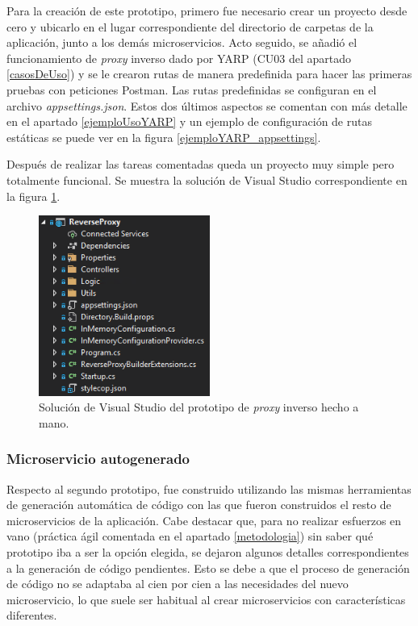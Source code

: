 \documentclass[11pt,spanish,listoffigures]{tfgetsinf}
\begin{document}
Para la creación de este prototipo, primero fue necesario crear un proyecto desde cero y ubicarlo en el lugar correspondiente del directorio de carpetas de la aplicación, junto a los demás microservicios. Acto seguido, se añadió el funcionamiento de \emph{proxy} inverso dado por YARP (CU03 del apartado \ref{casosDeUso}) y se le crearon rutas de manera predefinida para hacer las primeras pruebas con peticiones Postman. Las rutas predefinidas se configuran en el archivo \emph{appsettings.json}. Estos dos últimos aspectos se comentan con más detalle en el apartado \ref{ejemploUsoYARP} y un ejemplo de configuración de rutas estáticas se puede ver en la figura \ref{ejemploYARP_appsettings}.

Después de realizar las tareas comentadas queda un proyecto muy simple pero totalmente funcional. Se muestra la solución de Visual Studio correspondiente en la figura \ref{prototipoMano}.

\begin{figure}[ht]
\centering
\includegraphics[width=0.5\textwidth]{imagenes/prototipoMano}
\caption{Solución de Visual Studio del prototipo de \emph{proxy} inverso hecho a mano.}
	\label{prototipoMano}
\end{figure}


			\subsubsection{Microservicio autogenerado}

Respecto al segundo prototipo, fue construido utilizando las mismas herramientas de generación automática de código con las que fueron construidos el resto de microservicios de la aplicación. Cabe destacar que, para no realizar esfuerzos en vano (práctica ágil comentada en el apartado \ref{metodologia}) sin saber qué prototipo iba a ser la opción elegida, se dejaron algunos detalles correspondientes a la generación de código pendientes. Esto se debe a que el proceso de generación de código no se adaptaba al cien por cien a las necesidades del nuevo microservicio, lo que suele ser habitual al crear microservicios con características diferentes.
\end{document}
